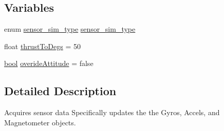 \subsection*{Variables}
\begin{DoxyCompactItemize}
\item 
enum \hyperlink{group___sensors_ga6423b17c1c5cfe30ec2b9cabedc03f70}{sensor\-\_\-sim\-\_\-type} \hyperlink{group___sensors_gaa5e76bc9bc1cc20d2b183069aea687b4}{sensor\-\_\-sim\-\_\-type}
\item 
float \hyperlink{group___sensors_ga0bfc1acfbf1c0b59ebaeba678cb8c811}{thrust\-To\-Degs} = 50
\item 
\hyperlink{group___exported__types_gaf6a258d8f3ee5206d682d799316314b1}{bool} \hyperlink{group___sensors_ga4003f7985e24e407bbc2f44b2d289c29}{overide\-Attitude} = false
\end{DoxyCompactItemize}


\subsection{Detailed Description}
Acquires sensor data Specifically updates the the Gyros, Accels, and Magnetometer objects. 

